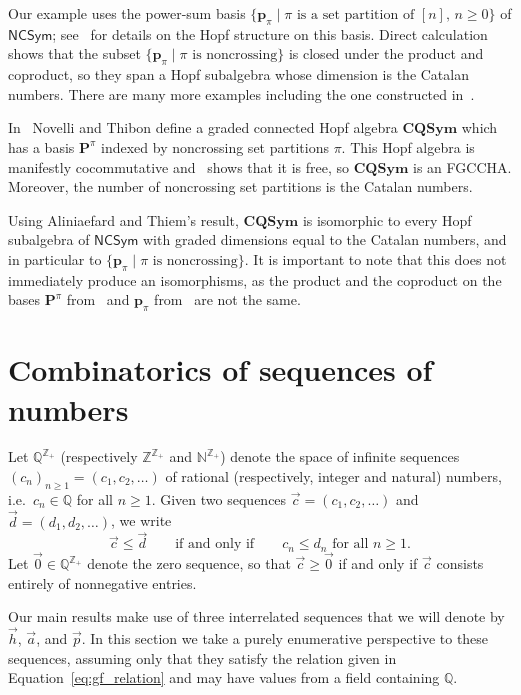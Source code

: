 \documentclass[11pt]{amsart}
\theoremstyle{definition}
\newtheorem{example}[theorem]{Example}
\numberwithin{equation}{section}
\def\NN{{\mathbb N}}
\def\ZZ{{\mathbb Z}}
\def\QQ{{\mathbb Q}}
\newcommand{\FGCCHA}{\textsf{FGCCHA}\xspace}
\newcommand{\NCSym}{\mathsf{NCSym}}
\begin{document}
Our example uses the power-sum basis $\{\mathbf{p}_{\pi} \;|\; \text{$\pi$ is a set partition of $[n]$, $n \ge 0$}\}$ of $\mathsf{NCSym}$; see~\cite{BHRZ05} for details on the Hopf structure on this basis.  
Direct calculation shows that the subset $\{\mathbf{p}_{\pi} \;|\; \text{$\pi$ is noncrossing}\}$ is closed under the product and coproduct, so they span a Hopf subalgebra whose dimension is the Catalan numbers.  
There are many more examples including the one constructed in~\cite{AT20}.

In~\cite{NT05} Novelli and Thibon define a graded connected Hopf algebra $\mathbf{CQSym}$ which has a basis $\mathbf{P}^{\pi}$ indexed by noncrossing set partitions $\pi$.  
This Hopf algebra is manifestly cocommutative and~\cite[Proposition 5.2]{NT05} shows that it is free, so $\mathbf{CQSym}$ is an \FGCCHA.  
Moreover, the number of noncrossing set partitions is the Catalan numbers.

Using Aliniaefard and Thiem's result, $\mathbf{CQSym}$ is isomorphic to every Hopf subalgebra of $\NCSym$ with graded dimensions equal to the Catalan numbers, and in particular to $\{\mathbf{p}_{\pi} \;|\; \text{$\pi$ is noncrossing}\}$.  
It is important to note that this does not immediately produce an isomorphisms, as the product and the coproduct on the bases $\mathbf{P}^{\pi}$ from~\cite{NT05} and $\mathbf{p}_{\pi}$ from~\cite{BHRZ05} are not the same.

\section{Combinatorics of sequences of numbers}
\label{sec:SequencePrelims}

Let $\QQ^{\ZZ_+}$ (respectively $\ZZ^{\ZZ_+}$ and $\NN^{\ZZ_+}$) denote the space of infinite sequences
$(c_{n})_{n \ge 1} = (c_{1}, c_{2}, \ldots)$ of rational (respectively, integer and natural) numbers,
i.e.~$c_{n} \in \QQ$ for all $n \ge 1$.
Given two sequences $\vec{c} = (c_{1}, c_{2}, \ldots)$ and $\vec{d} = (d_{1}, d_{2}, \ldots)$, we write
\[
\vec{c} \le \vec{d} 
\qquad\text{if and only if}\qquad
\text{$c_{n} \le d_{n}$ for all $n \ge 1$}.
\]
Let $\vec{0} \in \QQ^{\ZZ_+}$ denote the zero sequence, so that $\vec{c} \ge \vec{0}$
if and only if $\vec{c}$ consists entirely of nonnegative entries.

Our main results make use of three interrelated sequences that we will denote by $\vec{h}$, $\vec{a}$, and $\vec{p}$.  
In this section we take a purely enumerative perspective to these sequences, assuming only that they satisfy the relation given in Equation~\eqref{eq:gf_relation} and may have values from a field containing $\QQ$.  
\end{document}

